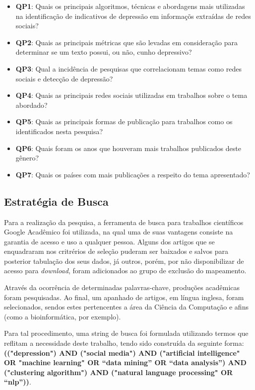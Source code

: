 \documentclass[conference]{IEEEtran}
\begin{document}
\begin{itemize}
    \item \textbf{QP1}: Quais os principais algoritmos, técnicas e abordagens mais utilizadas na identificação de indicativos de depressão em informaçõs extraídas de redes sociais?
    \item \textbf{QP2}: Quais as principais métricas que são levadas em consideração para determinar se um texto possui, ou não, cunho depressivo?
    \item \textbf{QP3}: Qual a incidência de pesquisas que correlacionam temas como redes sociais e detecção de depressão?
    \item \textbf{QP4}: Quais as principais redes sociais utilizadas em trabalhos sobre o tema abordado?
    \item \textbf{QP5}: Quais as principais formas de publicação para trabalhos como os identificados nesta pesquisa?
    \item \textbf{QP6}: Quais foram os anos que houveram mais trabalhos publicados deste gênero?
    \item \textbf{QP7}: Quais os países com mais publicações a respeito do tema apresentado?
\end{itemize}

\subsection{Estratégia de Busca}
Para a realização da pesquisa, a ferramenta de busca para trabalhos científicos Google Acadêmico foi utilizada, na qual uma de suas vantagens consiste na garantia de acesso e uso a qualquer pessoa. Alguns dos artigos que se enquadraram nos critrérios de seleção puderam ser baixados e salvos para posterior tabulação dos seus dados, já outros, porém, por não disponibilizar de acesso para \textit{download}, foram adicionados ao grupo de exclusão do mapeamento.

Através da ocorrência de determinadas palavras-chave, produções acadêmicas foram pesquisadas. Ao final, um apanhado de artigos, em língua inglesa, foram selecionados, sendos estes pertencentes a área da Ciência da Computação e afins (como a bioinformática, por exemplo).

Para tal procedimento, uma string de busca foi formulada utilizando termos que reflitam a necessidade deste trabalho, tendo sido construída da seguinte forma: \textbf{(("depression") AND ("social media") AND ("artificial intelligence" OR "machine learning" OR “data mining” OR “data analysis”) AND ("clustering algorithm") AND ("natural language processing" OR “nlp”))}.
\end{document}
